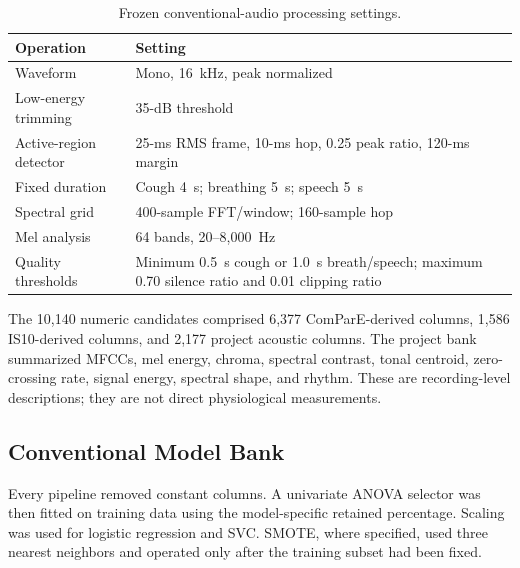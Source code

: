 \begin{table}[!h]
\centering
\caption{Frozen conventional-audio processing settings.}
\label{tab:audio-settings}
\begin{tabular}{ll}
\toprule
Operation & Setting \\
\midrule
Waveform & Mono, 16~kHz, peak normalized \\
Low-energy trimming & 35-dB threshold \\
Active-region detector & 25-ms RMS frame, 10-ms hop, 0.25 peak ratio,
120-ms margin \\
Fixed duration & Cough 4~s; breathing 5~s; speech 5~s \\
Spectral grid & 400-sample FFT/window; 160-sample hop \\
Mel analysis & 64 bands, 20--8,000~Hz \\
Quality thresholds & Minimum 0.5~s cough or 1.0~s breath/speech; maximum
0.70 silence ratio and 0.01 clipping ratio \\
\bottomrule
\end{tabular}
\end{table}

The 10,140 numeric candidates comprised 6,377 ComParE-derived columns, 1,586
IS10-derived columns, and 2,177 project acoustic columns. The project bank
summarized MFCCs, mel energy, chroma, spectral contrast, tonal centroid,
zero-crossing rate, signal energy, spectral shape, and rhythm. These are
recording-level descriptions; they are not direct physiological measurements.

\subsection{Conventional Model Bank}

Every pipeline removed constant columns. A univariate ANOVA selector was then
fitted on training data using the model-specific retained percentage. Scaling
was used for logistic regression and SVC. SMOTE, where specified, used three
nearest neighbors and operated only after the training subset had been fixed.

